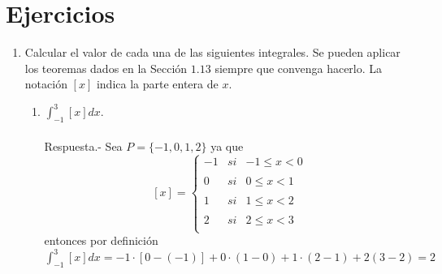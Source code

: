 \setcounter{section}{14}
\section{Ejercicios}

\begin{enumerate}[ \bfseries 1.]

    \item Calcular el valor de cada una de las siguientes integrales. Se pueden aplicar los teoremas dados en la Sección $1.13$ siempre que convenga hacerlo. La notación $[x]$ indica la parte entera de $x$.

    \begin{enumerate}[\bfseries (a)]
	
	\item $\displaystyle\int_{-1}^{3} [x] dx.$\\\\ 
	    Respuesta.-\; Sea $P=\lbrace -1,0,1,2 \rbrace$ ya que 
	    $$[x] = \left\{ \begin{array}{rcl}
		-1&si& -1\leq x <0\\
		\\ 0&si& 0\leq x < 1 \\
		\\ 1&si& 1\leq x < 2 \\
		\\ 2&si& 2\leq x < 3 \\
		\end{array}\right.$$
	    entonces por definición $\displaystyle\int_{-1}^{3} [x] dx = -1\cdot [0-(-1)] + 0\cdot (1-0) + 1\cdot (2-1) + 2(3-2) = 2$\\\\


\end{enumerate}
\end{enumerate}
